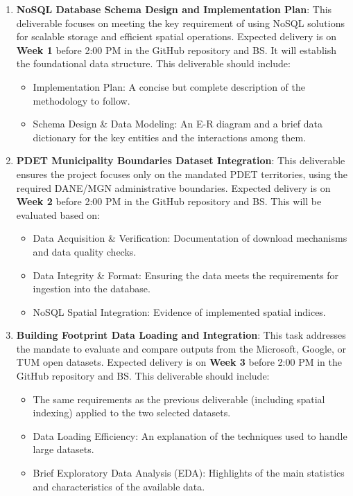 \documentclass[12pt]{article}
\begin{document}
  \begin{enumerate}
    \item \textbf{NoSQL Database Schema Design and Implementation Plan}: This deliverable focuses on meeting the key requirement of using NoSQL solutions for scalable storage and efficient spatial operations. Expected delivery is on \textbf{Week 1} before 2:00 PM in the GitHub repository and BS\texttrademark. It will establish the foundational data structure. This deliverable should include:
    \begin{itemize}
      \item Implementation Plan: A concise but complete description of the methodology to follow.
      \item Schema Design \& Data Modeling: An E-R diagram and a brief data dictionary for the key entities and the interactions among them.
    \end{itemize}

    \item \textbf{PDET Municipality Boundaries Dataset Integration}: This deliverable ensures the project focuses only on the mandated PDET territories, using the required DANE/MGN administrative boundaries. Expected delivery is on \textbf{Week 2} before 2:00 PM in the GitHub repository and BS\texttrademark. This will be evaluated based on:
        \begin{itemize}
          \item Data Acquisition \& Verification: Documentation of download mechanisms and data quality checks.
          \item Data Integrity \& Format: Ensuring the data meets the requirements for ingestion into the database.
          \item NoSQL Spatial Integration: Evidence of implemented spatial indices.
        \end{itemize}

    \item \textbf{Building Footprint Data Loading and Integration}: This task addresses the mandate to evaluate and compare outputs from the Microsoft, Google, or TUM open datasets. Expected delivery is on \textbf{Week 3} before 2:00 PM in the GitHub repository and BS\texttrademark. This deliverable should include:
        \begin{itemize}
          \item The same requirements as the previous deliverable (including spatial indexing) applied to the two selected datasets.
          \item Data Loading Efficiency: An explanation of the techniques used to handle large datasets.
          \item Brief Exploratory Data Analysis (EDA): Highlights of the main statistics and characteristics of the available data.
        \end{itemize}


\end{enumerate}
\end{document}
